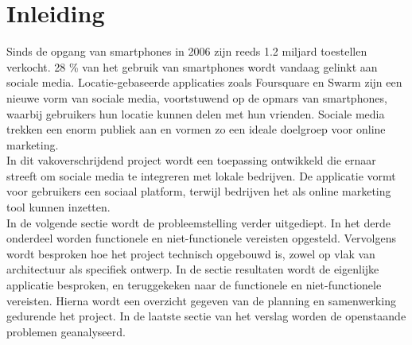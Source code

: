 \chapter{Inleiding}

Sinds de opgang van smartphones in 2006 zijn reeds 1.2 miljard toestellen verkocht\cite{smartphone_sales}. 28 \% van het gebruik van smartphones wordt vandaag gelinkt aan sociale media. Locatie-gebaseerde applicaties zoals Foursquare\cite{foursquare} en Swarm\cite{swarm} zijn een nieuwe vorm van sociale media, voortstuwend op de opmars van smartphones, waarbij gebruikers hun locatie kunnen delen met hun vrienden.
Sociale media trekken een enorm publiek aan en vormen zo een ideale doelgroep voor online marketing.\\

In dit vakoverschrijdend project wordt een toepassing ontwikkeld die ernaar streeft om sociale media te integreren met lokale bedrijven.
De applicatie vormt voor gebruikers een sociaal platform, terwijl bedrijven het als online marketing tool kunnen inzetten.\\

In de volgende sectie wordt de probleemstelling verder uitgediept. In het derde onderdeel worden functionele en niet-functionele vereisten opgesteld. Vervolgens wordt besproken hoe het project technisch opgebouwd is, zowel op vlak van architectuur als specifiek ontwerp. In de sectie resultaten wordt de eigenlijke applicatie besproken, en teruggekeken naar de functionele en niet-functionele vereisten. Hierna wordt een overzicht gegeven van de planning en samenwerking gedurende het project. In de laatste sectie van het verslag worden de openstaande problemen geanalyseerd.